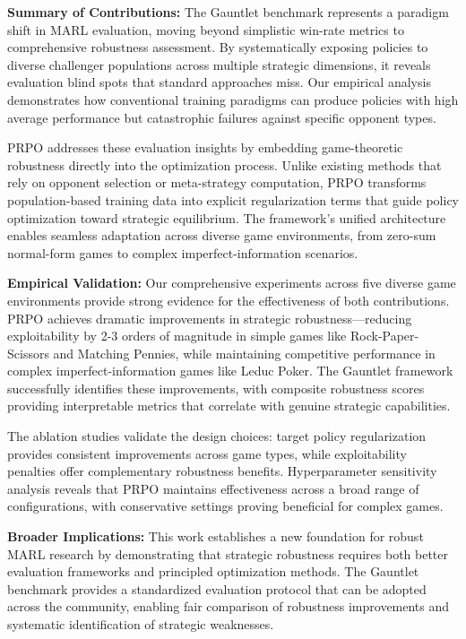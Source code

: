 \documentclass[sigconf,anonymous]{aamas}
\begin{document}
\textbf{Summary of Contributions:} The Gauntlet benchmark represents a paradigm shift in MARL evaluation, moving beyond simplistic win-rate metrics to comprehensive robustness assessment. By systematically exposing policies to diverse challenger populations across multiple strategic dimensions, it reveals evaluation blind spots that standard approaches miss. Our empirical analysis demonstrates how conventional training paradigms can produce policies with high average performance but catastrophic failures against specific opponent types.

PRPO addresses these evaluation insights by embedding game-theoretic robustness directly into the optimization process. Unlike existing methods that rely on opponent selection or meta-strategy computation, PRPO transforms population-based training data into explicit regularization terms that guide policy optimization toward strategic equilibrium. The framework's unified architecture enables seamless adaptation across diverse game environments, from zero-sum normal-form games to complex imperfect-information scenarios.

\textbf{Empirical Validation:} Our comprehensive experiments across five diverse game environments provide strong evidence for the effectiveness of both contributions. PRPO achieves dramatic improvements in strategic robustness—reducing exploitability by 2-3 orders of magnitude in simple games like Rock-Paper-Scissors and Matching Pennies, while maintaining competitive performance in complex imperfect-information games like Leduc Poker. The Gauntlet framework successfully identifies these improvements, with composite robustness scores providing interpretable metrics that correlate with genuine strategic capabilities.

The ablation studies validate the design choices: target policy regularization provides consistent improvements across game types, while exploitability penalties offer complementary robustness benefits. Hyperparameter sensitivity analysis reveals that PRPO maintains effectiveness across a broad range of configurations, with conservative settings proving beneficial for complex games.

\textbf{Broader Implications:} This work establishes a new foundation for robust MARL research by demonstrating that strategic robustness requires both better evaluation frameworks and principled optimization methods. The Gauntlet benchmark provides a standardized evaluation protocol that can be adopted across the community, enabling fair comparison of robustness improvements and systematic identification of strategic weaknesses.
\end{document}
